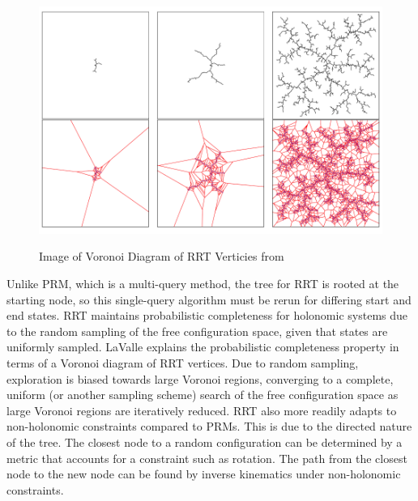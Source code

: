 \documentclass[11pt]{article}
\begin{document}
            \begin{figure}
                \centering
                \includegraphics[width=0.65\linewidth]{algorithms/voronoi.png}
                \label{fig:voronoi}
                \caption{Image of Voronoi Diagram of RRT Verticies from \protect\cite{kuffner_rrt-connect_2000}}
            \end{figure}
            \par Unlike PRM, which is a multi-query method, the tree for RRT is rooted at the starting node, so this single-query algorithm must be rerun for differing start and end states. RRT maintains probabilistic completeness for holonomic systems due to the random sampling of the free configuration space, given that states are uniformly sampled. LaValle explains the probabilistic completeness property in terms of a Voronoi diagram of RRT vertices. Due to random sampling, exploration is biased towards large Voronoi regions, converging to a complete, uniform (or another sampling scheme) search of the free configuration space as large Voronoi regions are iteratively reduced. RRT also more readily adapts to non-holonomic constraints compared to PRMs. This is due to the directed nature of the tree. The closest node to a random configuration can be determined by a metric that accounts for a constraint such as rotation. The path from the closest node to the new node can be found by inverse kinematics under non-holonomic constraints.
\end{document}
